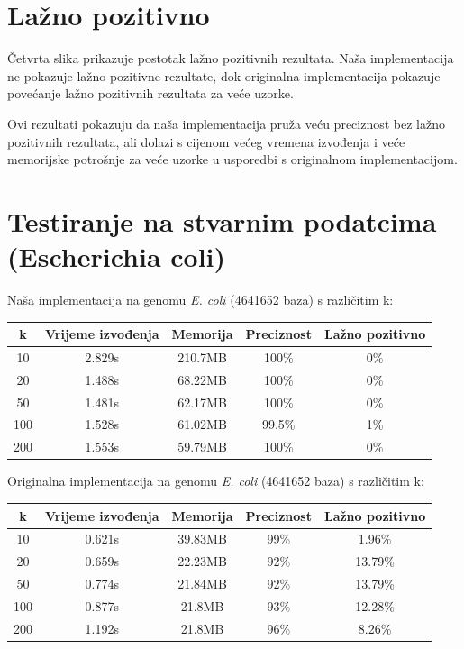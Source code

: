 \documentclass[seminarskirad]{fer}
\begin{document}
\section{Lažno pozitivno}
Četvrta slika prikazuje postotak lažno pozitivnih rezultata. Naša implementacija ne pokazuje lažno pozitivne rezultate, dok originalna implementacija pokazuje povećanje lažno pozitivnih rezultata za veće uzorke.

Ovi rezultati pokazuju da naša implementacija pruža veću preciznost bez lažno pozitivnih rezultata, ali dolazi s cijenom većeg vremena izvođenja i veće memorijske potrošnje za veće uzorke u usporedbi s originalnom implementacijom.


\section{Testiranje na stvarnim podatcima (Escherichia coli)}
Naša implementacija na genomu \textit{E. coli} (4641652 baza) s različitim k:

\begin{center}
	\small
	\begin{tabular}{||c c c c c||} 
		\hline
		k & Vrijeme izvođenja & Memorija & Preciznost & Lažno pozitivno \\ [0.5ex] 
		\hline\hline
		10 & 2.829s & 210.7MB & 100\% & 0\% \\ 
		\hline
		20 & 1.488s & 68.22MB & 100\% & 0\% \\
		\hline
		50 & 1.481s & 62.17MB & 100\% & 0\% \\
		\hline
		100 & 1.528s & 61.02MB & 99.5\% & 1\% \\
		\hline
		200 & 1.553s & 59.79MB & 100\% & 0\% \\ [1ex] 
		\hline
	\end{tabular}
\end{center}

Originalna implementacija na genomu \textit{E. coli} (4641652 baza) s različitim k:

\begin{center}
	\small
	\begin{tabular}{||c c c c c||} 
		\hline
		k & Vrijeme izvođenja & Memorija & Preciznost & Lažno pozitivno \\ [0.5ex] 
		\hline\hline
		10 & 0.621s & 39.83MB & 99\% & 1.96\% \\ 
		\hline
		20 & 0.659s & 22.23MB & 92\% & 13.79\% \\
		\hline
		50 & 0.774s & 21.84MB & 92\% & 13.79\% \\
		\hline
		100 & 0.877s & 21.8MB & 93\% & 12.28\% \\
		\hline
		200 & 1.192s & 21.8MB & 96\% & 8.26\% \\ [1ex] 
		\hline
	\end{tabular}
\end{center}
\end{document}
